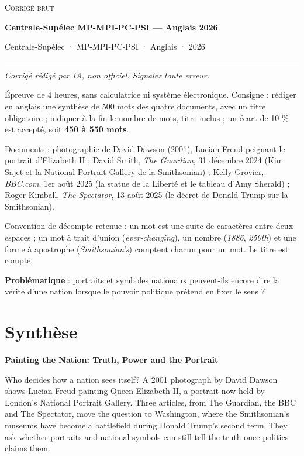 \documentclass[11pt,a4paper]{article}
\begin{document}
\thispagestyle{plain}
\begin{center}
  {\small\scshape Corrigé brut}\par\smallskip
  {\LARGE\bfseries Centrale-Supélec MP-MPI-PC-PSI — Anglais 2026\par}\medskip
  {\large Centrale-Supélec · MP-MPI-PC-PSI · Anglais · 2026\par}
\end{center}
\vspace{2pt}\hrule\vspace{8pt}

\emph{Corrigé rédigé par IA, non officiel. Signalez toute erreur.}

Épreuve de 4 heures, sans calculatrice ni système électronique. Consigne : rédiger en anglais une synthèse de 500 mots des quatre documents, avec un titre obligatoire ; indiquer à la fin le nombre de mots, titre inclus ; un écart de 10 \% est accepté, soit \textbf{450 à 550 mots}.

Documents : photographie de David Dawson (2001), Lucian Freud peignant le portrait d'Elizabeth II ; David Smith, \emph{The Guardian}, 31 décembre 2024 (Kim Sajet et la National Portrait Gallery de la Smithsonian) ; Kelly Grovier, \emph{BBC.com}, 1er août 2025 (la statue de la Liberté et le tableau d'Amy Sherald) ; Roger Kimball, \emph{The Spectator}, 13 août 2025 (le décret de Donald Trump sur la Smithsonian).

Convention de décompte retenue : un mot est une suite de caractères entre deux espaces ; un mot à trait d'union (\emph{ever-changing}), un nombre (\emph{1886}, \emph{250th}) et une forme à apostrophe (\emph{Smithsonian's}) comptent chacun pour un mot. Le titre est compté.

\textbf{Problématique} : portraits et symboles nationaux peuvent-ils encore dire la vérité d'une nation lorsque le pouvoir politique prétend en fixer le sens ?

\hypertarget{synthuxe8se}{%
\section{Synthèse}\label{synthuxe8se}}

\textbf{Painting the Nation: Truth, Power and the Portrait}

Who decides how a nation sees itself? A 2001 photograph by David Dawson shows Lucian Freud painting Queen Elizabeth II, a portrait now held by London's National Portrait Gallery. Three articles, from The Guardian, the BBC and The Spectator, move the question to Washington, where the Smithsonian's museums have become a battlefield during Donald Trump's second term. They ask whether portraits and national symbols can still tell the truth once politics claims them.
\end{document}

